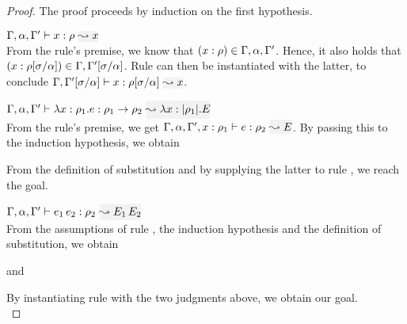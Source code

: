 \begin{proof}
The proof proceeds by induction on the first hypothesis.\\

\item[\fbox{\rref{Ty-Var}}]\quad$\wte{\tenv,\alpha,\tenv'}{x}{\rulet}{x}$\\

From the rule's premise, we know that $(x:\rho) \in \Gamma,\alpha, \Gamma'$.
Hence, it also holds that
$(x:\rho[\sigma/\alpha]) \in \Gamma,\Gamma'[\sigma/\alpha]$. Rule  can then be instantiated with the latter, to conclude
$\wte{\tenv,\tenv'[\suty/\alpha]}{x}{\rulet[\suty/\alpha]}{x}$.\\

\item[\fbox{\rref{Ty-Abs}}]\quad$\wte{\tenv,\alpha,\tenv'}{\abs{x}{\rulet_1}{e}}{\rulet_1\to\rulet_2}{\abs{x}{\etrans{\rulet_1}}{E}}$\\

From the rule's premise, we get
$\wte{\tenv,\alpha,\tenv',\relation{x}{\rulet_1}}{e}{\rulet_2}{E}$. By passing this to the
induction hypothesis, we obtain
\begin{myequation*}
\end{myequation*}
From the definition of substitution and by supplying the latter to rule , we reach
the goal.\\

\item[\fbox{\rref{Ty-App}}]\quad$\wte{\tenv,\alpha,\tenv'}{\mmapp{e_1}{e_2}}{\rulet_2}{\mmapp{E_1}{E_2}}$\\

From the assumptions of rule , the induction hypothesis and the definition of
substitution, we obtain
\begin{myequation*}
\end{myequation*}
and
\begin{myequation*}
\end{myequation*}
By instantiating rule  with the two judgments above, we obtain our goal.\\


\end{proof}
